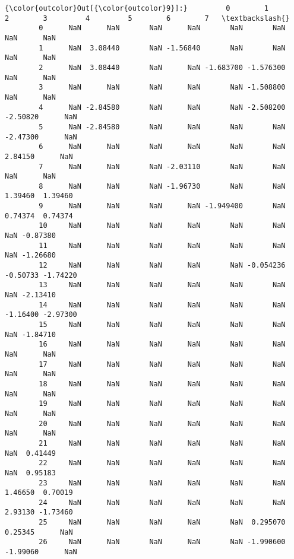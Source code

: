 \documentclass[11pt]{article}
\begin{document}
\begin{Verbatim}[commandchars=\\\{\}]
{\color{outcolor}Out[{\color{outcolor}9}]:}         0        1         2        3         4         5        6        7   \textbackslash{}
        0      NaN      NaN       NaN      NaN       NaN       NaN      NaN      NaN   
        1      NaN  3.08440       NaN -1.56840       NaN       NaN      NaN      NaN   
        2      NaN  3.08440       NaN      NaN -1.683700 -1.576300      NaN      NaN   
        3      NaN      NaN       NaN      NaN       NaN -1.508800      NaN      NaN   
        4      NaN -2.84580       NaN      NaN       NaN -2.508200 -2.50820      NaN   
        5      NaN -2.84580       NaN      NaN       NaN       NaN -2.47300      NaN   
        6      NaN      NaN       NaN      NaN       NaN       NaN  2.84150      NaN   
        7      NaN      NaN       NaN -2.03110       NaN       NaN      NaN      NaN   
        8      NaN      NaN       NaN -1.96730       NaN       NaN  1.39460  1.39460   
        9      NaN      NaN       NaN      NaN -1.949400       NaN  0.74374  0.74374   
        10     NaN      NaN       NaN      NaN       NaN       NaN      NaN -0.87380   
        11     NaN      NaN       NaN      NaN       NaN       NaN      NaN -1.26680   
        12     NaN      NaN       NaN      NaN       NaN -0.054236 -0.50733 -1.74220   
        13     NaN      NaN       NaN      NaN       NaN       NaN      NaN -2.13410   
        14     NaN      NaN       NaN      NaN       NaN       NaN -1.16400 -2.97300   
        15     NaN      NaN       NaN      NaN       NaN       NaN      NaN -1.84710   
        16     NaN      NaN       NaN      NaN       NaN       NaN      NaN      NaN   
        17     NaN      NaN       NaN      NaN       NaN       NaN      NaN      NaN   
        18     NaN      NaN       NaN      NaN       NaN       NaN      NaN      NaN   
        19     NaN      NaN       NaN      NaN       NaN       NaN      NaN      NaN   
        20     NaN      NaN       NaN      NaN       NaN       NaN      NaN      NaN   
        21     NaN      NaN       NaN      NaN       NaN       NaN      NaN  0.41449   
        22     NaN      NaN       NaN      NaN       NaN       NaN      NaN  0.95183   
        23     NaN      NaN       NaN      NaN       NaN       NaN  1.46650  0.70019   
        24     NaN      NaN       NaN      NaN       NaN       NaN  2.93130 -1.73460   
        25     NaN      NaN       NaN      NaN       NaN  0.295070  0.25345      NaN   
        26     NaN      NaN       NaN      NaN       NaN -1.990600 -1.99060      NaN   

\end{Verbatim}
\end{document}
